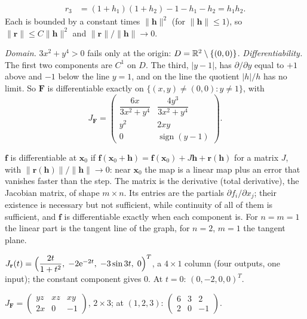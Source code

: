 \begin{solutions}
\[\begin{aligned}
          r_{3}&=(1+h_{1})(1+h_{2})-1-h_{1}-h_{2}=h_{1}h_{2} .
        \end{aligned}\]
        Each is bounded by a constant times $\|\mathbf{h}\|^{2}$ (for
        $\|\mathbf{h}\|\le1$), so
        $\|\mathbf{r}\|\le C\|\mathbf{h}\|^{2}$ and
        $\|\mathbf{r}\|/\|\mathbf{h}\|\to0$.
  \item \emph{Domain.} $3x^{2}+y^{4}>0$ fails only at the origin: $D=\mathbb{R}^{2}
        \setminus\{(0,0)\}$. \emph{Differentiability.} The first two
        components are $C^{1}$ on $D$. The third, $|y-1|$, has
        $\partial/\partial y$ equal to $+1$ above and $-1$ below the line
        $y=1$, and on the line the quotient $|h|/h$ has no limit. So
        $\mathbf{F}$ is differentiable exactly on
        $\{(x,y)\neq(0,0):y\neq1\}$, with
        \[
          J_{\mathbf{F}}=\begin{pmatrix}
            \dfrac{6x}{3x^{2}+y^{4}}&\dfrac{4y^{3}}{3x^{2}+y^{4}}\\[1.2ex]
            y^{2}&2xy\\ 0&\operatorname{sign}(y-1)\end{pmatrix} .
        \]
  \item $\mathbf{f}$ is differentiable at $\mathbf{x}_{0}$ if
        $\mathbf{f}(\mathbf{x}_{0}+\mathbf{h})=\mathbf{f}(\mathbf{x}_{0})
        +J\mathbf{h}+\mathbf{r}(\mathbf{h})$ for a matrix $J$, with
        $\|\mathbf{r}(\mathbf{h})\|/\|\mathbf{h}\|\to0$: near
        $\mathbf{x}_{0}$ the map is a linear map plus an error that vanishes
        faster than the step. The matrix is the derivative (total
        derivative), the Jacobian matrix, of shape $m\times n$. Its entries
        are the partials $\partial f_{i}/\partial x_{j}$; their existence is
        necessary but not sufficient, while continuity of all of them is
        sufficient, and $\mathbf{f}$ is differentiable exactly when each
        component is. For $n=m=1$ the linear part is the tangent line of
        the graph, for $n=2$, $m=1$ the tangent plane.
  \item $J_{\mathbf{r}}(t)=\Bigl(\dfrac{2t}{1+t^{2}},\;-2\mathrm{e}^{-2t},
        \;-3\sin3t,\;0\Bigr)^{T}$, a $4\times1$ column (four outputs, one
        input); the constant component gives $0$. At $t=0$:
        $(0,-2,0,0)^{T}$.
  \item $J_{\mathbf{F}}=\begin{pmatrix}yz&xz&xy\\2x&0&-1\end{pmatrix}$,
        $2\times3$; at $(1,2,3)$: $\begin{pmatrix}6&3&2\\2&0&-1\end{pmatrix}$.

\end{solutions}
